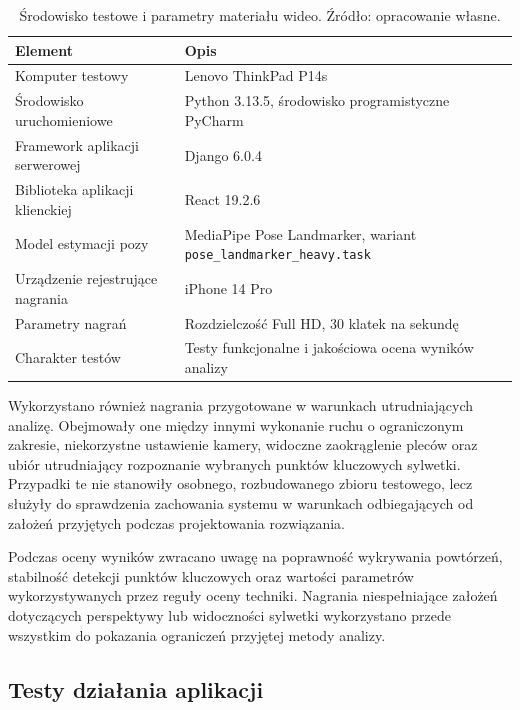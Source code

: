 \begin{table}[H]
\centering
\caption{Środowisko testowe i parametry materiału wideo. Źródło: opracowanie własne.}
\label{tab:srodowisko-testowe}
\begin{tabular}{|
>{\raggedright\arraybackslash}p{4.5cm}|
>{\raggedright\arraybackslash}p{8cm}|}
\hline
\textbf{Element} & \textbf{Opis} \\ \hline
Komputer testowy & Lenovo ThinkPad P14s \\ \hline
Środowisko uruchomieniowe & Python 3.13.5, środowisko programistyczne PyCharm \\ \hline
Framework aplikacji serwerowej & Django 6.0.4 \\ \hline
Biblioteka aplikacji klienckiej & React 19.2.6 \\ \hline
Model estymacji pozy & MediaPipe Pose Landmarker, wariant \texttt{pose\_landmarker\_heavy.task} \\ \hline
Urządzenie rejestrujące nagrania & iPhone 14 Pro \\ \hline
Parametry nagrań & Rozdzielczość Full HD, 30 klatek na sekundę \\ \hline
Charakter testów & Testy funkcjonalne i jakościowa ocena wyników analizy \\ \hline
\end{tabular}
\end{table}

Wykorzystano również nagrania przygotowane w warunkach utrudniających analizę. Obejmowały one między innymi wykonanie ruchu o ograniczonym zakresie, niekorzystne ustawienie kamery, widoczne zaokrąglenie pleców oraz ubiór utrudniający rozpoznanie wybranych punktów kluczowych sylwetki. Przypadki te nie stanowiły osobnego, rozbudowanego zbioru testowego, lecz służyły do sprawdzenia zachowania systemu w warunkach odbiegających od założeń przyjętych podczas projektowania rozwiązania.

Podczas oceny wyników zwracano uwagę na poprawność wykrywania powtórzeń, stabilność detekcji punktów kluczowych oraz wartości parametrów wykorzystywanych przez reguły oceny techniki. Nagrania niespełniające założeń dotyczących perspektywy lub widoczności sylwetki wykorzystano przede wszystkim do pokazania ograniczeń przyjętej metody analizy.

\subsection{Testy działania aplikacji}

